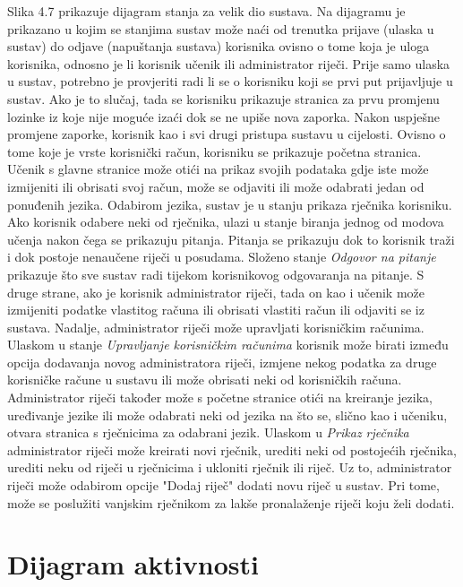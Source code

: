			Slika 4.7 prikazuje dijagram stanja za velik dio sustava. Na dijagramu je prikazano u kojim se stanjima sustav može naći od trenutka prijave (ulaska u sustav) do odjave (napuštanja sustava) korisnika ovisno o tome koja je uloga korisnika, odnosno je li korisnik učenik ili administrator riječi. Prije samo ulaska u sustav, potrebno je provjeriti radi li se o korisniku koji se prvi put prijavljuje u sustav. Ako je to slučaj, tada se korisniku prikazuje stranica za prvu promjenu lozinke iz koje nije moguće izaći dok se ne upiše nova zaporka. Nakon uspješne promjene zaporke, korisnik kao i svi drugi pristupa sustavu u cijelosti. Ovisno o tome koje je vrste korisnički račun, korisniku se prikazuje početna stranica. Učenik s glavne stranice može otići na prikaz svojih podataka gdje iste može izmijeniti ili obrisati svoj račun, može se odjaviti ili može odabrati jedan od ponuđenih jezika. Odabirom jezika, sustav je u stanju prikaza rječnika korisniku. Ako korisnik odabere neki od rječnika, ulazi u stanje biranja jednog od modova učenja nakon čega se prikazuju pitanja. Pitanja se prikazuju dok to korisnik traži i dok postoje nenaučene riječi u posudama. Složeno stanje \textit{Odgovor na pitanje} prikazuje što sve sustav radi tijekom korisnikovog odgovaranja na pitanje. S druge strane, ako je korisnik administrator riječi, tada on kao i učenik može izmijeniti podatke vlastitog računa ili obrisati vlastiti račun ili odjaviti se iz sustava. Nadalje, administrator riječi može upravljati korisničkim računima. Ulaskom u stanje \textit{Upravljanje korisničkim računima} korisnik može birati između opcija dodavanja novog administratora riječi, izmjene nekog podatka za druge korisničke račune u sustavu ili može obrisati neki od korisničkih računa. Administrator riječi također može s početne stranice otići na kreiranje jezika, uređivanje jezike ili može odabrati neki od jezika na što se, slično kao i učeniku, otvara stranica s rječnicima za odabrani jezik. Ulaskom u \textit{Prikaz rječnika} administrator riječi može kreirati novi rječnik, urediti neki od postojećih rječnika, urediti neku od riječi u rječnicima i ukloniti rječnik ili riječ. Uz to, administrator riječi može odabirom opcije "Dodaj riječ" dodati novu riječ u sustav. Pri tome, može se poslužiti vanjskim rječnikom za lakše pronalaženje riječi koju želi dodati.
			
			\eject 
		
		\section{Dijagram aktivnosti}
			

